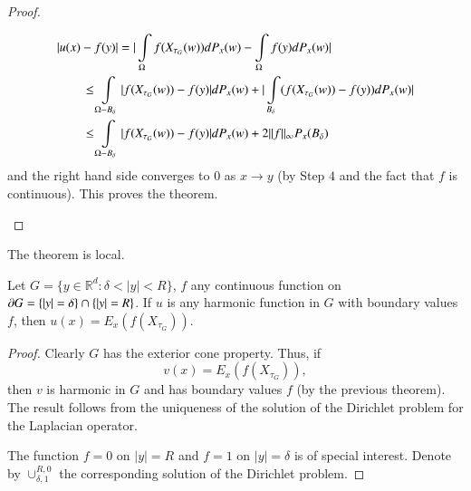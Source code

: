 \begin{proof}
\begin{step}%
\begin{align*}
& |u(x)-f(y)|=|\int\limits_{\Omega}f(X_{\tau_{G}}(w))dP_{x}(w)-\int\limits_{\Omega}f(y)dP_{x}(w)|\\
&\qquad \leq
  \int\limits_{\Omega-B_{\delta}}|f(X_{\tau_{G}}(w))-f(y)|dP_{x}(w)+|\int\limits_{B_{\delta}}(f(X_{\tau_{G}}(w))-f(y))dP_{x}(w)|\\
&\qquad \leq \int\limits_{\Omega-B_{\delta}}|f(X_{\tau_{G}}(w))-f(y)|dP_{x}(w)+2||f||_{\infty}P_{x}(B_{\delta})
\end{align*}
and the right hand side converges to $0$ as $x\to y$ (by Step $4$ and
the fact that $f$ is continuous). This proves the theorem.
\end{step}
\end{proof}

\begin{remark*}
The theorem is local.
\end{remark*}

\begin{theorem*}
Let $G=\{y\in \mathbb{R}^{d}:\delta<|y|<R\}$, $f$ any continuous
function on $\partial G=\{|y|=\delta\}\cap \{|y|=R\}$. If $u$ is any harmonic
function in $G$ with boundary values $f$, then
$u(x)=E_{x}(f(X_{\tau_{G}}))$. 
\end{theorem*}

\begin{proof}
Clearly $G$ has the exterior cone property. Thus, if
$$
v(x)=E_{x}(f(X_{\tau_{G}})), 
$$
then $v$ is harmonic in $G$ and has
boundary values $f$ (by the previous theorem). The result follows from
the uniqueness of the solution of the Dirichlet problem for the
Laplacian operator.

The function $f=0$ on $|y|=R$ and $f=1$ on $|y|=\delta$ is of special
interest. Denote by $\cup^{R,0}_{\delta,1}$ the corresponding solution
of the Dirichlet problem.
\end{proof}

